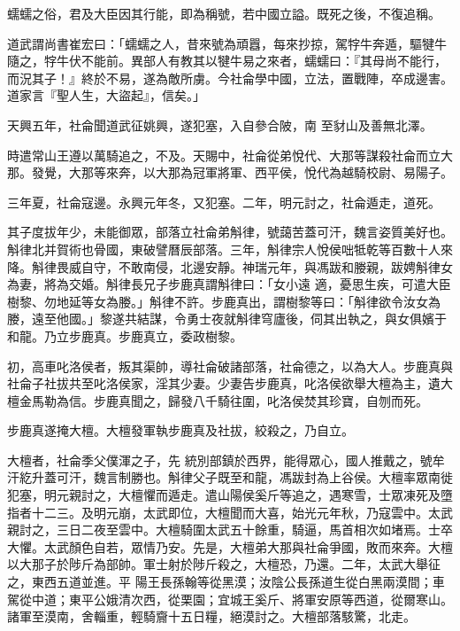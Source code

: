 \begin{pinyinscope}
 蠕蠕之俗，君及大臣因其行能，即為稱號，若中國立謚。既死之後，不復追稱。



 道武謂尚書崔宏曰：「蠕蠕之人，昔來號為頑囂，每來抄掠，駕牸牛奔遁，驅犍牛隨之，牸牛伏不能前。異部人有教其以犍牛易之來者，蠕蠕曰：『其母尚不能行，而況其子！』終於不易，遂為敵所虜。今社侖學中國，立法，置戰陣，卒成邊害。道家言『聖人生，大盜起』，信矣。」



 天興五年，社侖聞道武征姚興，遂犯塞，入自參合陂，南
 至豺山及善無北澤。



 時遣常山王遵以萬騎追之，不及。天賜中，社侖從弟悅代、大那等謀殺社侖而立大那。發覺，大那等來奔，以大那為冠軍將軍、西平侯，悅代為越騎校尉、易陽子。



 三年夏，社侖寇邊。永興元年冬，又犯塞。二年，明元討之，社侖遁走，道死。



 其子度拔年少，未能御眾，部落立社侖弟斛律，號藹苦蓋可汗，魏言姿質美好也。斛律北并賀術也骨國，東破譬曆辰部落。三年，斛律宗人悅侯咄牴乾等百數十人來降。斛律畏威自守，不敢南侵，北邊安靜。神瑞元年，與馮跋和媵親，跋娉斛律女為妻，將為交婚。斛律長兄子步鹿真謂斛律曰：「女小遠
 適，憂思生疾，可遣大臣樹黎、勿地延等女為媵。」斛律不許。步鹿真出，謂樹黎等曰：「斛律欲令汝女為媵，遠至他國。」黎遂共結謀，令勇士夜就斛律穹廬後，伺其出執之，與女俱嬪于和龍。乃立步鹿真。步鹿真立，委政樹黎。



 初，高車叱洛侯者，叛其渠帥，導社侖破諸部落，社侖德之，以為大人。步鹿真與社侖子社拔共至叱洛侯家，淫其少妻。少妻告步鹿真，叱洛侯欲舉大檀為主，遺大檀金馬勒為信。步鹿真聞之，歸發八千騎往圍，叱洛侯焚其珍寶，自刎而死。



 步鹿真遂掩大檀。大檀發軍執步鹿真及社拔，絞殺之，乃自立。



 大檀者，社侖季父僕渾之子，先
 統別部鎮於西界，能得眾心，國人推戴之，號牟汗紇升蓋可汗，魏言制勝也。斛律父子既至和龍，馮跋封為上谷侯。大檀率眾南徙犯塞，明元親討之，大檀懼而遁走。遣山陽侯奚斤等追之，遇寒雪，士眾凍死及墮指者十二三。及明元崩，太武即位，大檀聞而大喜，始光元年秋，乃寇雲中。太武親討之，三日二夜至雲中。大檀騎圍太武五十餘重，騎逼，馬首相次如堵焉。士卒大懼。太武顏色自若，眾情乃安。先是，大檀弟大那與社侖爭國，敗而來奔。大檀以大那子於陟斤為部帥。軍士射於陟斤殺之，大檀恐，乃還。二年，太武大舉征之，東西五道並進。平
 陽王長孫翰等從黑漠；汝陰公長孫道生從白黑兩漠間；車駕從中道；東平公娥清次西，從栗園；宜城王奚斤、將軍安原等西道，從爾寒山。諸軍至漠南，舍輜重，輕騎齎十五日糧，絕漠討之。大檀部落駭驚，北走。




\end{pinyinscope}
